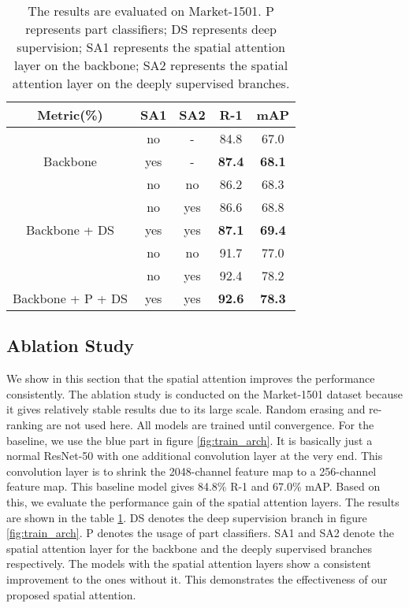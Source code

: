 \documentclass[10pt,twocolumn,letterpaper]{article}
\begin{document}
\begin{table}[!ht]
\begin{center}
\begin{tabular}{c|cc|cc}
\hline \hline
Metric(\%) & SA1 & SA2 & R-1 & mAP \\ \hline
 & no & - & 84.8 & 67.0 \\
\multirow{-2}{*}{Backbone} & yes & - & {\color[HTML]{3166FF} \textbf{87.4}} & {\color[HTML]{3166FF} \textbf{68.1}} \\ \hline
 & no & no & 86.2 & 68.3 \\
 & no & yes & 86.6 & 68.8 \\
\multirow{-3}{*}{Backbone + DS} & yes & yes & {\color[HTML]{3166FF} \textbf{87.1}} & {\color[HTML]{3166FF} \textbf{69.4}} \\ \hline
 & no & no & 91.7 & 77.0 \\
 & no & yes & {\color[HTML]{333333} 92.4} & {\color[HTML]{333333} 78.2} \\
\multirow{-3}{*}{Backbone + P + DS} & yes & yes & {\color[HTML]{3166FF} \textbf{92.6}} & {\color[HTML]{3166FF} \textbf{78.3}} \\ \hline \hline
\end{tabular}
\end{center}
\caption{The results are evaluated on Market-1501. P represents part classifiers; DS represents deep supervision; SA1 represents the spatial attention layer on the backbone; SA2 represents the spatial attention layer on the deeply supervised branches.}
\label{table:whrclassifier}
\end{table}

\subsection{Ablation Study} \label{ablation}
We show in this section that the spatial attention improves the performance consistently. The ablation study is conducted on the Market-1501 dataset because it gives relatively stable results due to its large scale. Random erasing and re-ranking are not used here. All  models are trained until convergence. For the baseline, we use the blue part in figure \ref{fig:train_arch}. It is basically just a normal ResNet-50 with one additional convolution layer at the very end. This convolution layer is to shrink the 2048-channel feature map to a 256-channel feature map. This baseline model gives 84.8\% R-1 and 67.0\% mAP. Based on this, we evaluate the performance gain of the spatial attention layers. The results are shown in the table \ref{table:whrclassifier}. DS denotes the deep supervision branch in figure \ref{fig:train_arch}. P denotes the usage of part classifiers. SA1 and SA2 denote the spatial attention layer for the backbone and the deeply supervised branches respectively. The models with the spatial attention layers show a consistent improvement to the ones without it. This demonstrates the effectiveness of our proposed spatial attention.
\end{document}
